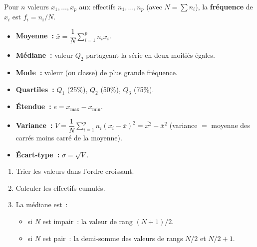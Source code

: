 \begin{defn}
Pour $n$ valeurs $x_1,\ldots,x_p$ aux effectifs $n_1,\ldots,n_p$
(avec $N=\sum n_i$), la \textbf{fr\'equence} de $x_i$ est $f_i=n_i/N$.
\end{defn}

\begin{defn}
\begin{itemize}
  \item \textbf{Moyenne~:} $\bar{x} = \dfrac{1}{N}\sum_{i=1}^p n_i x_i$.
  \item \textbf{M\'ediane~:} valeur $Q_2$ partageant la s\'erie en deux moiti\'es \'egales.
  \item \textbf{Mode~:} valeur (ou classe) de plus grande fr\'equence.
  \item \textbf{Quartiles~:} $Q_1$ (25\%), $Q_2$ (50\%), $Q_3$ (75\%).
\end{itemize}
\end{defn}

\begin{defn}
\begin{itemize}
  \item \textbf{\'Etendue~:} $e = x_{\max} - x_{\min}$.
  \item \textbf{Variance~:}
        $V = \dfrac{1}{N}\sum_{i=1}^p n_i(x_i-\bar{x})^2
           = \overline{x^2} - \bar{x}^2$
        (variance $=$ moyenne des carr\'es moins carr\'e de la moyenne).
  \item \textbf{\'Ecart-type~:} $\sigma = \sqrt{V}$.
\end{itemize}
\end{defn}

\begin{methode}
\begin{enumerate}
  \item Trier les valeurs dans l'ordre croissant.
  \item Calculer les effectifs cumul\'es.
  \item La m\'ediane est~:
    \begin{itemize}
      \item si $N$ est impair~: la valeur de rang $(N+1)/2$.
      \item si $N$ est pair~: la demi-somme des valeurs de rangs $N/2$ et $N/2+1$.
    \end{itemize}
\end{enumerate}
\end{methode}

